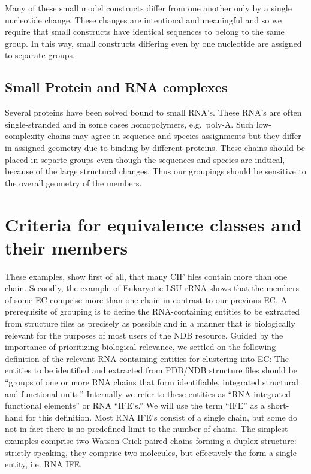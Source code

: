 Many of these small model constructs differ from one another only by a single
nucleotide change. These changes are intentional and meaningful and so we
require that small constructs have identical sequences to belong to the same
group. In this way, small constructs differing even by one nucleotide are
assigned to separate groups.

\subsection{Small Protein and RNA complexes}

Several proteins have been solved bound to  small RNA's. These RNA's are often
single-stranded and in some cases homopolymers, e.g.\ poly-A. Such low-complexity
chains may agree in sequence and species assignments but they differ in assigned
geometry due to binding by different proteins. These chains should be placed in
separte groups even though the sequences and species are indtical, because of
the large structural changes. Thus our groupings should be sensitive to the
overall geometry of the members.

\section{Criteria for equivalence classes and their members}

These examples, show first of all, that many CIF files contain more than one
chain. Secondly, the example of Eukaryotic LSU rRNA shows that the members of
some EC comprise more than one chain in contrast to our previous EC\@. A
prerequisite of grouping is to define the RNA-containing entities to be
extracted from structure files as precisely as possible and in a manner that is
biologically relevant for the purposes of most users of the NDB resource. Guided
by the importance of prioritizing biological relevance, we settled on the
following definition of the relevant RNA-containing entities for clustering into
EC: The entities to be identified and extracted from PDB/NDB structure files
should be ``groups of one or more RNA chains that form identifiable, integrated
structural and functional units.'' Internally we refer to these entities as
``RNA integrated functional elements'' or RNA ``IFE's.'' We will use the term
``IFE'' as a short-hand for this definition.  Most RNA IFE's consist of a single
chain, but some do not in fact there is no predefined limit to the number of
chains. The simplest examples comprise two Watson-Crick paired chains
forming a duplex structure: strictly speaking, they comprise two molecules, but
effectively the form a single entity, i.e. RNA IFE\@.

